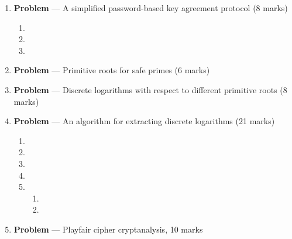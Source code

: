 \documentclass[11pt]{article}
\theoremstyle{definition}
\newcounter{problem}
\begin{document}
\begin{enumerate}
\newpage

\item[] \textbf{Problem \theproblem} --- A simplified password-based key agreement protocol (8
    marks)

\begin{enumerate}
\item

\item

\item
\end{enumerate}


\newpage

\item[] \textbf{Problem \theproblem} --- Primitive roots for safe primes (6 marks)

\newpage

\item[] \textbf{Problem \theproblem} --- Discrete logarithms with respect to different primitive
    roots (8 marks)

\newpage

\item[] \textbf{Problem \theproblem} --- An algorithm for extracting discrete logarithms (21
    marks)

\begin{enumerate}
\item

\item

\item

\item

\item
    \begin{enumerate}
    \item

    \item
\end{enumerate}
\end{enumerate}

\newpage

 

\item[] \textbf{Problem \theproblem} --- Playfair cipher cryptanalysis, 10 marks

\end{enumerate}
\end{document}
